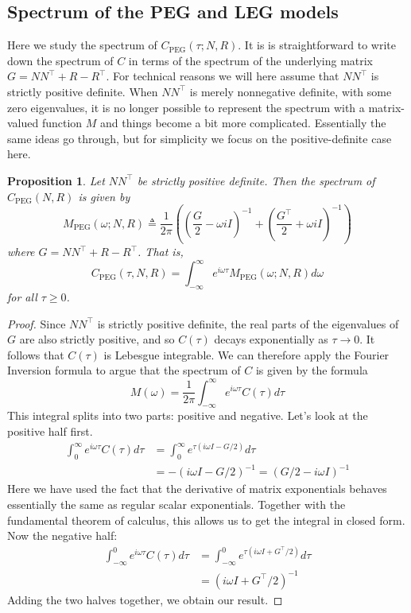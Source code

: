 \documentclass{article}
\newtheorem{prop}{Proposition}
\theoremstyle{definition}
\newcommand{\PEG}{\mathrm{PEG}}
\begin{document}
\subsection{Spectrum of the PEG and LEG models}

Here we study the spectrum of $C_\PEG(\tau;N,R)$.  It is is straightforward to write down the spectrum of $C$ in terms of the spectrum of the underlying matrix $G=N N^\top + R-R^\top$.  For technical reasons we will here assume that $N N^\top$ is strictly positive definite.  When $N N^\top$ is merely nonnegative definite, with some zero eigenvalues, it is no longer possible to represent the spectrum with a matrix-valued function $M$ and things become a bit more complicated.  Essentially the same ideas go through, but for simplicity we focus on the positive-definite  case here.  

\begin{prop} \label{prop:pegspec}
Let $N N^\top$ be strictly positive definite.  Then the spectrum of $C_\PEG(N,R)$ is given by 
\[
M_\PEG(\omega;N,R)\triangleq \frac{1}{2\pi}  \left(
    \left(\frac{G}{2}-\omega i I\right)^{-1} + \left(\frac{G^\top}{2}+\omega i I\right)^{-1}\right)
\]
where $G=N N^\top + R -R^\top$.  That is, 
\[
C_\PEG(\tau,N,R)= \int_{-\infty}^\infty e^{i \omega \tau} M_\PEG(\omega;N,R)d\omega
\]
for all $\tau \geq 0$.
\end{prop}

\begin{proof}
Since $N N^\top$ is strictly positive definite, the real parts of the eigenvalues of $G$ are also strictly positive, and so $C(\tau)$ decays exponentially as $\tau \rightarrow 0$.  It follows that $C(\tau)$ is Lebesgue integrable.  We can therefore apply the Fourier Inversion formula to argue that the spectrum of $C$ is given by the formula
\[
M(\omega) = \frac{1}{2\pi} 
  \int_{-\infty }^{\infty} e^{i\omega \tau} C(\tau) d\tau 
\]
This integral splits into two parts: positive and negative.  Let's look at the positive half first.  
\begin{align*}
\int_{0}^{\infty} e^{i\omega \tau} C(\tau) d\tau 
    &= \int_{0}^{\infty} e^{\tau(i\omega I - G/2)} d\tau \\
    &= -(i\omega I - G/2)^{-1} = (G/2 - i\omega I)^{-1} 
\end{align*}
Here we have used the fact that the derivative of matrix exponentials behaves essentially the same as regular scalar exponentials.  Together with the fundamental theorem of calculus, this allows us to get the integral in closed form.  Now the negative half:
\begin{align*}
\int_{-\infty}^{0} e^{i\omega \tau} C(\tau) d\tau 
    &= \int_{-\infty}^{0} e^{\tau(i\omega I + G^\top/2)} d\tau \\
    &= (i\omega I + G^\top/2)^{-1} 
\end{align*}
Adding the two halves together, we obtain our result.
\end{proof}
\end{document}
